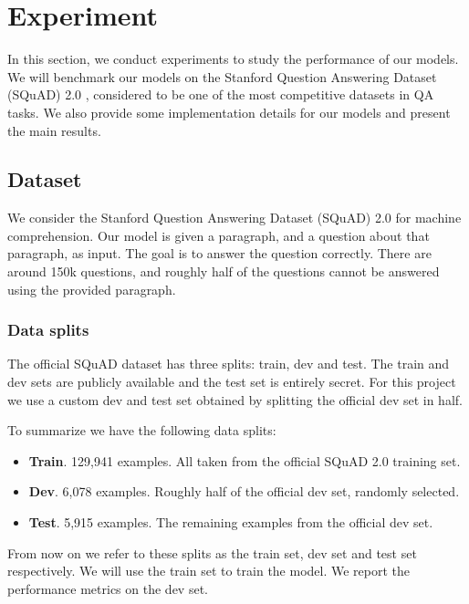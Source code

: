 \section{Experiment}
\label{sec:experiment}

In this section, we conduct experiments to study the performance of our models. We will benchmark our models on the Stanford Question Answering Dataset (SQuAD) 2.0 \cite{rajpurkar2018know}, considered to be one of the most competitive datasets in QA tasks. We also provide some implementation details for our models and present the main results.

\subsection{Dataset}
\label{subsec:dataset}

We consider the Stanford Question Answering Dataset (SQuAD) 2.0 \cite{rajpurkar2018know} for machine comprehension. Our model is given a paragraph, and a question about that paragraph, as input. The goal is to answer the question correctly. There are around 150k questions, and roughly half of the questions cannot be answered using the provided paragraph. 


\subsubsection{Data splits}
\label{subsubsec:dataset}

The official SQuAD dataset has three splits: train, dev and test. The train and dev sets are publicly available and the test set is entirely secret. For this project we use a custom dev and test set obtained by splitting the official dev set in half. 

To summarize we have the following data splits:

\begin{itemize}
\item \textbf{Train}. 129,941 examples. All taken from the official SQuAD 2.0 training set.
\item \textbf{Dev}. 6,078 examples. Roughly half of the official dev set, randomly selected.
\item \textbf{Test}. 5,915 examples. The remaining examples from the official dev set.
\end{itemize}

From now on we refer to these splits as the train set, dev set and test set respectively. We will use the train set to train the model. We report the performance metrics on the dev set.

